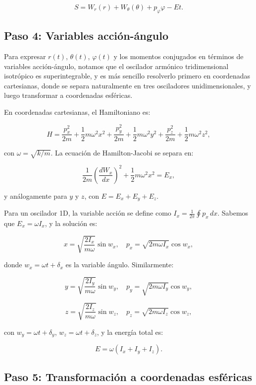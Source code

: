 \documentclass[12pt]{article}
\begin{document}
\begin{enumerate}
  \[
  S = W_r(r) + W_\theta(\theta) + p_\varphi \varphi - E t.
  \]

  \subsection*{Paso 4: Variables acción-ángulo}

  Para expresar \( r(t) \), \( \theta(t) \), \( \varphi(t) \) y los momentos conjugados en términos de variables acción-ángulo, notamos que el oscilador armónico tridimensional isotrópico es superintegrable, y es más sencillo resolverlo primero en coordenadas cartesianas, donde se separa naturalmente en tres osciladores unidimensionales, y luego transformar a coordenadas esféricas.

  En coordenadas cartesianas, el Hamiltoniano es:

  \[
  H = \frac{p_x^2}{2m} + \frac{1}{2} m \omega^2 x^2 + \frac{p_y^2}{2m} + \frac{1}{2} m \omega^2 y^2 + \frac{p_z^2}{2m} + \frac{1}{2} m \omega^2 z^2,
  \]

  con \( \omega = \sqrt{k/m} \). La ecuación de Hamilton-Jacobi se separa en:

  \[
  \frac{1}{2m} \left( \frac{d W_x}{dx} \right)^2 + \frac{1}{2} m \omega^2 x^2 = E_x,
  \]

  y análogamente para \( y \) y \( z \), con \( E = E_x + E_y + E_z \).

  Para un oscilador 1D, la variable acción se define como \( I_x = \frac{1}{2\pi} \oint p_x \, dx \). Sabemos que \( E_x = \omega I_x \), y la solución es:

  \[
  x = \sqrt{\frac{2 I_x}{m \omega}} \sin w_x, \quad p_x = \sqrt{2 m \omega I_x} \cos w_x,
  \]

  donde \( w_x = \omega t + \delta_x \) es la variable ángulo. Similarmente:

  \[
  y = \sqrt{\frac{2 I_y}{m \omega}} \sin w_y, \quad p_y = \sqrt{2 m \omega I_y} \cos w_y,
  \]

  \[
  z = \sqrt{\frac{2 I_z}{m \omega}} \sin w_z, \quad p_z = \sqrt{2 m \omega I_z} \cos w_z,
  \]

  con \( w_y = \omega t + \delta_y \), \( w_z = \omega t + \delta_z \), y la energía total es:

  \[
  E = \omega (I_x + I_y + I_z).
  \]

  \subsection*{Paso 5: Transformación a coordenadas esféricas}


\end{enumerate}
\end{document}
